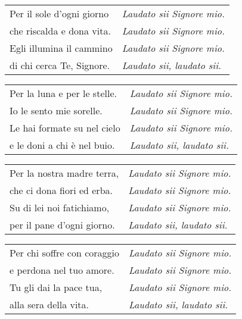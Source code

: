 

\spazio

\begin{tabular}{@{} p{5.5cm} p{5cm}}
Per il sole d'ogni giorno & \emph{Laudato sii Signore mio.}\\
che riscalda e dona vita. & \emph{Laudato sii Signore mio.}\\
Egli illumina il cammino & \emph{Laudato sii Signore mio.}\\
di chi cerca Te, Signore. & \emph{Laudato sii, laudato sii.}
\end{tabular}

\spazio

\begin{tabular}{@{} p{5.5cm} p{5cm}}
Per la luna e per le stelle. & \emph{Laudato sii Signore mio.}\\
Io le sento mie sorelle. & \emph{Laudato sii Signore mio.}\\
Le hai formate su nel cielo & \emph{Laudato sii Signore mio.}\\
e le doni a chi è nel buio.  & \emph{Laudato sii, laudato sii.}
\end{tabular}

\spazio


\spazio

\begin{tabular}{@{} p{5.5cm} p{5cm}}
Per la nostra madre terra, & \emph{Laudato sii Signore mio.}\\
che ci dona fiori ed erba. & \emph{Laudato sii Signore mio.}\\
Su di lei noi fatichiamo, & \emph{Laudato sii Signore mio.}\\
per il pane d'ogni giorno. & \emph{Laudato sii, laudato sii.}
\end{tabular}

\spazio

\begin{tabular}{@{} p{5.5cm} p{5cm}}
Per chi soffre con coraggio & \emph{Laudato sii Signore mio.}\\
e perdona nel tuo amore. & \emph{Laudato sii Signore mio.}\\
Tu gli dai la pace tua, & \emph{Laudato sii Signore mio.}\\
alla sera della vita. & \emph{Laudato sii, laudato sii.}
\end{tabular}

